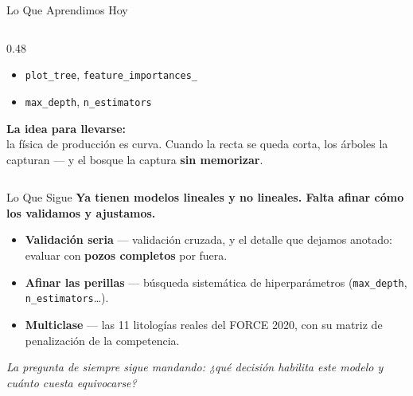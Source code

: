 \documentclass[aspectratio=169, 11pt]{beamer}
\begin{document}
\begin{frame}{Lo Que Aprendimos Hoy}
\begin{columns}[T]
\begin{column}{0.48\textwidth}
{\begin{itemize}
        \item[{\color{arcaRed}\scriptsize\faTools}]
          \texttt{plot\_tree}, \texttt{feature\_importances\_}
        \item[{\color{arcaRed}\scriptsize\faTools}]
          \texttt{max\_depth}, \texttt{n\_estimators}
      \end{itemize}
      }
      \vspace{8pt}
      \begin{tcolorbox}[colback=arcaGray, colframe=arcaRed, boxrule=0pt, leftrule=3pt,
        arc=3pt, left=6pt, right=6pt, top=5pt, bottom=5pt]
        {\scriptsize\color{arcaDark}\bfseries La idea para llevarse:}\\[3pt]
        {\scriptsize\color{textMuted}
          la física de producción es curva. Cuando la recta
          se queda corta, los árboles la capturan ---
          y el bosque la captura \textbf{sin memorizar}.}
      \end{tcolorbox}
    \end{column}
  \end{columns}
\end{frame}

\begin{frame}{Lo Que Sigue}
  \vspace{-6pt}
  {\small\color{arcaDark}\bfseries
    Ya tienen modelos lineales y no lineales. Falta afinar cómo los validamos y ajustamos.}

  \vspace{10pt}
  {\footnotesize
  \begin{itemize}\setlength{\itemsep}{7pt}
    \item[{\color{arcaRed}\Large\faArrowCircleRight}]
      \textbf{Validación seria} --- validación cruzada, y el detalle que dejamos
      anotado: evaluar con \textbf{pozos completos} por fuera.

    \item[{\color{arcaRed}\Large\faArrowCircleRight}]
      \textbf{Afinar las perillas} --- búsqueda sistemática de hiperparámetros
      (\texttt{max\_depth}, \texttt{n\_estimators}\ldots).

    \item[{\color{arcaRed}\Large\faArrowCircleRight}]
      \textbf{Multiclase} --- las 11 litologías reales del FORCE 2020, con
      su matriz de penalización de la competencia.
  \end{itemize}
  }

  \vspace{10pt}
  \centering
  {\footnotesize\color{arcaDark}\itshape
    La pregunta de siempre sigue mandando: ¿qué decisión habilita este modelo
    y cuánto cuesta equivocarse?}
\end{frame}
\end{document}
